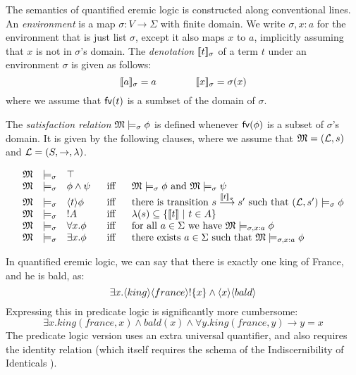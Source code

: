 \begin{definition}
The semantics of quantified eremic logic is constructed along
conventional lines. An \emph{environment} is a map $\sigma : V
\rightarrow \Sigma$ with finite domain.  We write $\sigma, x : a$ for
the environment that is just list $\sigma$, except it also maps $x$ to
$a$, implicitly assuming that $x$ is not in $\sigma$'s domain.  The
\emph{denotation} $\lbrack\!\lbrack t \rbrack\!\rbrack_{\sigma}$ of a term $t$ under an
environment $\sigma$ is given as follows:
\[
   \lbrack\!\lbrack a \rbrack\!\rbrack_{\sigma} = a
      \qquad\qquad
   \lbrack\!\lbrack x \rbrack\!\rbrack_{\sigma} = \sigma(x)
\]
where we assume that $\mathsf{fv}(t)$ is a sumbset of the domain of $\sigma$.

The \emph{satisfaction
  relation} $\frak{M} \models_{\sigma} \phi$ is defined whenever
$\mathsf{fv}(\phi)$ is a subset of $\sigma$'s domain. It is given by the
following clauses, where we assume that $\frak{M} = (\mathcal{L}, s)$ and $\mathcal{L} =
(S, \rightarrow, \lambda)$.

\[
\begin{array}{lclcl}
  \MMM & \models_{\sigma} & \top   \\
  \MMM & \models_{\sigma} & \phi \AND \psi &\ \mbox{ iff } \ & \MMM  \models_{\sigma} \phi \mbox { and } \MMM \models_{\sigma} \psi  \\
  \MMM & \models_{\sigma} & \langle t \rangle \phi & \mbox{ iff } & \text{there is transition } s \TRANS{\SEMB{t}_{\sigma}} s' \mbox { such that } (\LLL, s') \models_{\sigma} \phi  \\
  \MMM & \models_{\sigma} & \fBang A &\mbox{ iff } & \lambda(s) \subseteq \{\SEMB{t}\ |\ t \in A\} \\
  \MMM & \models_{\sigma} & \forall x.\phi &\mbox{ iff } & \text{for all} \ a \in \Sigma\ \text{we have}\ \MMM \models_{\sigma, x : a} \phi \\
  \MMM & \models_{\sigma} & \exists x.\phi &\mbox{ iff } & \text{there exists} \ a \in \Sigma \ \text{such that}\  \MMM \models_{\sigma, x : a} \phi
\end{array}
\]


\end{definition}

In quantified eremic logic, we can say that there is exactly one king of France, and he is bald, as:
\[
\exists x . \langle king \rangle \langle france \rangle ! \{x\} \land \langle x \rangle \langle bald \rangle \]
Expressing this in predicate logic is significantly more cumbersome:
\[
\exists x. king(france, x) \land bald(x) \land \forall y. king(france, y) \rightarrow y = x
\]
The predicate logic version uses an extra universal quantifier, and also requires the identity relation (which itself requires the schema of the Indiscernibility of Identicals ).


